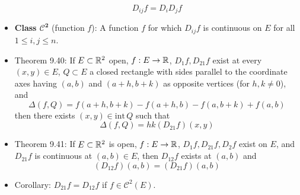\documentclass[../notes.tex]{subfiles}
\begin{document}
\begin{itemize}
    \begin{equation*}
        D_{ij}f = D_iD_jf
    \end{equation*}
    \item \textbf{Class $\pmb{\mathscr{C}^2}$} (function $f$): A function $f$ for which $D_{ij}f$ is continuous on $E$ for all $1\leq i,j\leq n$.
    \item Theorem 9.40: If $E\subset\mathbb{R}^2$ open, $f:E\to\mathbb{R}$, $D_1f,D_{21}f$ exist at every $(x,y)\in E$, $Q\subset E$ a closed rectangle with sides parallel to the coordinate axes having $(a,b)$ and $(a+h,b+k)$ as opposite vertices (for $h,k\neq 0$), and
    \begin{equation*}
        \Delta(f,Q) = f(a+h,b+k)-f(a+h,b)-f(a,b+k)+f(a,b)
    \end{equation*}
    then there exists $(x,y)\in\text{int}\,Q$ such that
    \begin{equation*}
        \Delta(f,Q) = hk(D_{21}f)(x,y)
    \end{equation*}
    \item Theorem 9.41: If $E\subset\mathbb{R}^2$ is open, $f:E\to\mathbb{R}$, $D_1f,D_{21}f,D_2f$ exist on $E$, and $D_{21}f$ is continuous at $(a,b)\in E$, then $D_{12}f$ exists at $(a,b)$ and
    \begin{equation*}
        (D_{12}f)(a,b) = (D_{21}f)(a,b)
    \end{equation*}
    \item Corollary: $D_{21}f=D_{12}f$ if $f\in\mathscr{C}^2(E)$.
\end{itemize}
\end{document}
